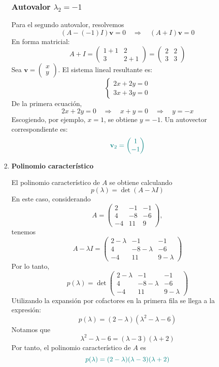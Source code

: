 \documentclass{article}
\begin{document}
\begin{enumerate}[label=\textbf{\alph*)}]
\subsubsection*{Autovalor \( \lambda_2 = -1 \)}

Para el segundo autovalor, resolvemos
\[
(A - (-1)I)\mathbf{v} = 0
\quad \Longrightarrow \quad
(A + I)\mathbf{v} = 0
\]
En forma matricial:
\[
A + I =
\begin{pmatrix}
1 + 1 & 2 \\
3 & 2 + 1
\end{pmatrix}
=
\begin{pmatrix}
2 & 2 \\
3 & 3
\end{pmatrix}
\]
Sea \( \mathbf{v} = \begin{pmatrix} x \\ y \end{pmatrix} \). El sistema lineal resultante es:
\[
\begin{cases}
2x + 2y = 0 \\
3x + 3y = 0
\end{cases}
\]
De la primera ecuación,
\[
2x + 2y = 0 
\quad \Longrightarrow \quad
x + y = 0 
\quad \Longrightarrow \quad
y = -x
\]
Escogiendo, por ejemplo, \( x = 1 \), se obtiene \( y = -1 \). Un autovector correspondiente es:
\[\color{teal}
\mathbf{v}_2 = \begin{pmatrix} 1 \\ -1 \end{pmatrix}
\]

    \item \textbf{Polinomio característico}
    
El polinomio característico de \( A \) se obtiene calculando
\[
p(\lambda) = \det(A - \lambda I)
\]
En este caso, considerando
\[
A =
\begin{pmatrix}
2 & -1 & -1 \\
4 & -8 & -6 \\
-4 & 11 & 9
\end{pmatrix},
\]
tenemos
\[
A - \lambda I =
\begin{pmatrix}
2-\lambda & -1 & -1 \\
4 & -8-\lambda & -6 \\
-4 & 11 & 9-\lambda
\end{pmatrix}
\]
Por lo tanto,
\[
p(\lambda) 
= \det\begin{pmatrix}
2-\lambda & -1 & -1 \\
4 & -8-\lambda & -6 \\
-4 & 11 & 9-\lambda
\end{pmatrix}
\]
Utilizando la expansión por cofactores en la primera fila se llega a la expresión:
\[
p(\lambda) = (2-\lambda)(\lambda^2 - \lambda - 6)
\]
Notamos que
\[
\lambda^2 - \lambda - 6 = (\lambda-3)(\lambda+2)
\]
Por tanto, el polinomio característico de \( A \) es
\[\color{teal}
p(\lambda) = (2-\lambda)(\lambda-3)(\lambda+2)
\]


\end{enumerate}
\end{document}
